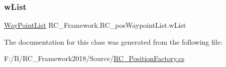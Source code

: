 \subsubsection{\texorpdfstring{w\+List}{wList}}
{\footnotesize\ttfamily \mbox{\hyperlink{class_r_c___framework_1_1_way_point_list}{Way\+Point\+List}} R\+C\+\_\+\+Framework.\+R\+C\+\_\+pos\+Waypoint\+List.\+w\+List}



The documentation for this class was generated from the following file\+:\begin{DoxyCompactItemize}
\item 
F\+:/\+B/\+R\+C\+\_\+\+Framework2018/\+Source/\mbox{\hyperlink{_r_c___position_factory_8cs}{R\+C\+\_\+\+Position\+Factory.\+cs}}\end{DoxyCompactItemize}
